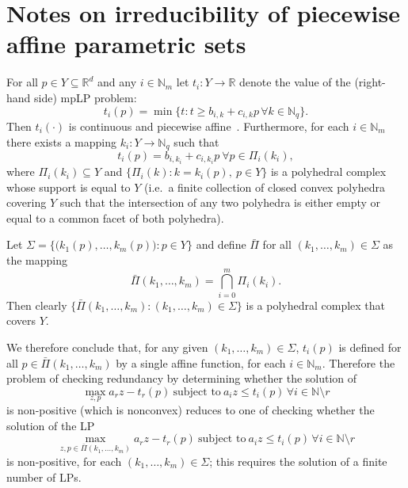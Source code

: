 \documentclass[journal]{IEEEtran}
\theoremstyle{remark}
\theoremstyle{definition}
\begin{document}
\section*{Notes on irreducibility of piecewise affine parametric sets}

For all $p\in Y\subseteq \mathbb{R}^d$ and any $i\in\mathbb{N}_m$ let $t_i : Y\to \mathbb{R}$ denote the value of the (right-hand side) mpLP problem:
\[
t_i(p) = \min \{ t : t \geq b_{i,k} + c_{i,k} p \, \forall k \in \mathbb{N}_q\} .
\]
%
Then $t_i(\cdot)$ is continuous and piecewise affine~\cite{Gal:1995}. 
%
Furthermore, for each $i\in\mathbb{N}_m$ there exists a mapping $k_i: Y\to \mathbb{N}_q$ such that
\[
t_i(p) = b_{i,k_i} + c_{i,k_i} p \ \forall p \in \Pi_i(k_i),
\]
where $\Pi_i(k_i)\subseteq Y$ and $\{\Pi_i(k) : k = k_i(p),\ p\in Y\}$ is a polyhedral complex whose support is equal to $Y$
%
(i.e.\ a finite collection of closed convex polyhedra covering $Y$ such that the intersection of any two polyhedra is either empty or equal to a common facet of both polyhedra).  

Let $\Sigma = \bigl\{ \bigl(k_1(p),\ldots,k_m(p)\bigr) : p\in Y\bigr\}$ and define 
$\bar{\Pi}$ for all $(k_1,\ldots,k_m)\in\Sigma$ 
as the mapping
\[
\bar{\Pi} (k_1,\ldots,k_m) = \bigcap_{i=0}^m \Pi_i (k_i) .
\]
Then clearly $\{\bar{\Pi} (k_1,\ldots,k_m): (k_1,\ldots,k_m)\in\Sigma\}$ is a polyhedral complex that covers $Y$.

We therefore conclude that, for any given $(k_1,\ldots,k_m)\in \Sigma$, $t_i(p)$ is defined for all $p\in\bar{\Pi}(k_1,\ldots,k_m)$ by a single affine function, for each $i\in \mathbb{N}_m$. Therefore the problem of checking redundancy by determining whether the solution of
\[
\max_{z,p} a_r z - t_r(p) \ \text{subject to} \ a_iz \leq t_i(p) \, \forall i\in\mathbb{N} \setminus r 
\]
is non-positive (which is nonconvex) reduces to one of checking whether the solution of the LP
\[
\max_{z,p\in\bar{\Pi}(k_1,\ldots,k_m)} a_r z - t_r(p) \ \text{subject to} \ a_iz \leq t_i(p) \, \forall i\in\mathbb{N} \setminus r 
\]
is non-positive, for each $(k_1,\ldots,k_m)\in\Sigma$; this requires the solution of a finite number of LPs.

\vfill



\newpage


\end{document}
